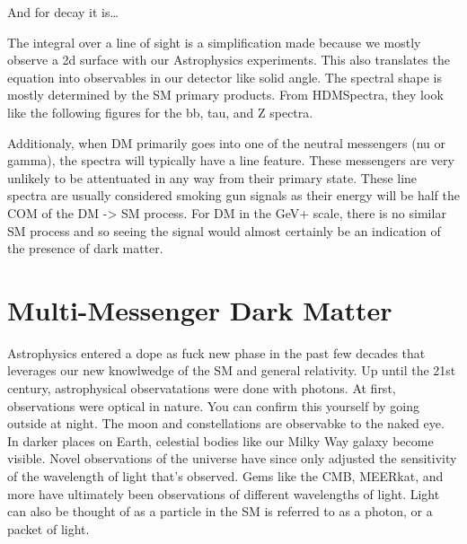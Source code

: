 
And for decay it is\dots



The integral over a line of sight is a simplification made because we mostly observe a 2d surface with our Astrophysics experiments.
This also translates the equation into observables in our detector like solid angle.
The spectral shape is mostly determined by the SM primary products.
From HDMSpectra, they look like the following figures for the bb, tau, and Z spectra.


Additionaly, when DM primarily goes into one of the neutral messengers (nu or gamma), the spectra will typically have a line feature.
These messengers are very unlikely to be attentuated in any way from their primary state.
These line spectra are usually considered smoking gun signals as their energy will be half the COM of the DM -> SM process.
For DM in the GeV+ scale, there is no similar SM process and so seeing the signal would almost certainly be an indication of the presence of dark matter.


\section{Multi-Messenger Dark Matter}

Astrophysics entered a dope as fuck new phase in the past few decades that leverages our new knowlwedge of the SM and general relativity.
Up until the 21st century, astrophysical observatations were done with photons.
At first, observations were optical in nature.
You can confirm this yourself by going outside at night.
The moon and constellations are observabke to the naked eye.
In darker places on Earth, celestial bodies like our Milky Way galaxy become visible.
Novel observations of the universe have since only adjusted the sensitivity of the wavelength of light that's observed.
Gems like the CMB, MEERkat, \ns and more have ultimately been observations of different wavelengths of light.
Light can also be thought of as a particle in the SM is referred to as a photon, or a packet of light.

